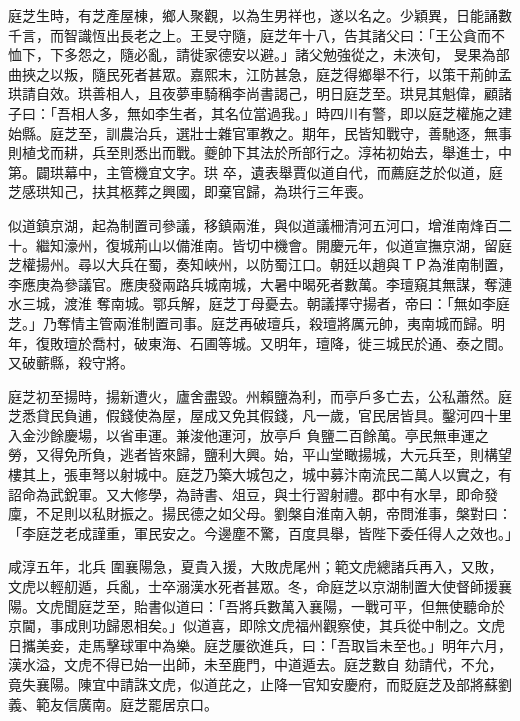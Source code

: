 \begin{pinyinscope}
 庭芝生時，有芝產屋棟，鄉人聚觀，以為生男祥也，遂以名之。少穎異，日能誦數千言，而智識恆出長老之上。王旻守隨，庭芝年十八，告其諸父曰：「王公貪而不恤下，下多怨之，隨必亂，請徙家德安以避。」諸父勉強從之，未浹旬，
 旻果為部曲挾之以叛，隨民死者甚眾。嘉熙末，江防甚急，庭芝得鄉舉不行，以策干荊帥孟珙請自效。珙善相人，且夜夢車騎稱李尚書謁己，明日庭芝至。珙見其魁偉，顧諸子曰：「吾相人多，無如李生者，其名位當過我。」時四川有警，即以庭芝權施之建始縣。庭芝至，訓農治兵，選壯士雜官軍教之。期年，民皆知戰守，善馳逐，無事則植戈而耕，兵至則悉出而戰。夔帥下其法於所部行之。淳祐初始去，舉進士，中第。闢珙幕中，主管機宜文字。珙
 卒，遺表舉賈似道自代，而薦庭芝於似道，庭芝感珙知己，扶其柩葬之興國，即棄官歸，為珙行三年喪。



 似道鎮京湖，起為制置司參議，移鎮兩淮，與似道議柵清河五河口，增淮南烽百二十。繼知濠州，復城荊山以備淮南。皆切中機會。開慶元年，似道宣撫京湖，留庭芝權揚州。尋以大兵在蜀，奏知峽州，以防蜀江口。朝廷以趙與ＴＰ為淮南制置，李應庚為參議官。應庚發兩路兵城南城，大暑中暍死者數萬。李璮窺其無謀，奪漣水三城，渡淮
 奪南城。鄂兵解，庭芝丁母憂去。朝議擇守揚者，帝曰：「無如李庭芝。」乃奪情主管兩淮制置司事。庭芝再破璮兵，殺璮將厲元帥，夷南城而歸。明年，復敗璮於喬村，破東海、石圃等城。又明年，璮降，徙三城民於通、泰之間。又破蘄縣，殺守將。



 庭芝初至揚時，揚新遭火，廬舍盡毀。州賴鹽為利，而亭戶多亡去，公私蕭然。庭芝悉貸民負逋，假錢使為屋，屋成又免其假錢，凡一歲，官民居皆具。鑿河四十里入金沙餘慶場，以省車運。兼浚他運河，放亭戶
 負鹽二百餘萬。亭民無車運之勞，又得免所負，逃者皆來歸，鹽利大興。始，平山堂瞰揚城，大元兵至，則構望樓其上，張車弩以射城中。庭芝乃築大城包之，城中募汴南流民二萬人以實之，有詔命為武銳軍。又大修學，為詩書、俎豆，與士行習射禮。郡中有水旱，即命發廩，不足則以私財振之。揚民德之如父母。劉槃自淮南入朝，帝問淮事，槃對曰：「李庭芝老成謹重，軍民安之。今邊塵不驚，百度具舉，皆陛下委任得人之效也。」



 咸淳五年，北兵
 圍襄陽急，夏貴入援，大敗虎尾州；範文虎總諸兵再入，又敗，文虎以輕舠遁，兵亂，士卒溺漢水死者甚眾。冬，命庭芝以京湖制置大使督師援襄陽。文虎聞庭芝至，貽書似道曰：「吾將兵數萬入襄陽，一戰可平，但無使聽命於京閫，事成則功歸恩相矣。」似道喜，即除文虎福州觀察使，其兵從中制之。文虎日攜美妾，走馬擊球軍中為樂。庭芝屢欲進兵，曰：「吾取旨未至也。」明年六月，漢水溢，文虎不得已始一出師，未至鹿門，中道遁去。庭芝數自
 劾請代，不允，竟失襄陽。陳宜中請誅文虎，似道芘之，止降一官知安慶府，而貶庭芝及部將蘇劉義、範友信廣南。庭芝罷居京口。




\end{pinyinscope}

